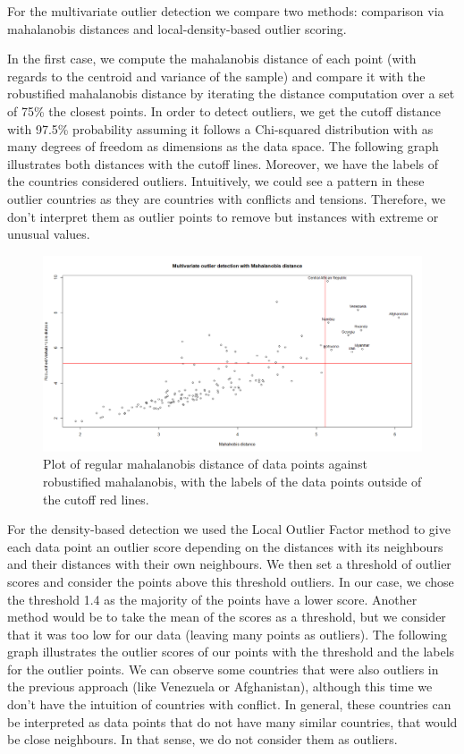 \documentclass[12pt]{extarticle}
\begin{document}
For the multivariate outlier detection we compare two methods: comparison via mahalanobis distances and local-density-based outlier scoring.

In the first case, we compute the mahalanobis distance of each point (with regards to the centroid and variance of the sample) and compare it with the robustified mahalanobis distance by iterating the distance computation over a set of 75\% the closest points. In order to detect outliers, we get the cutoff distance with 97.5\% probability assuming it follows a Chi-squared distribution with as many degrees of freedom as dimensions as the data space. The following graph illustrates both distances with the cutoff lines. Moreover, we have the labels of the countries considered outliers. Intuitively, we could see a pattern in these outlier countries as they are countries with conflicts and tensions. Therefore, we don’t interpret them as outlier points to remove but instances with extreme or unusual values.

\begin{figure}[H]
  \centering
    \includegraphics[width=1
    \textwidth]{figures/mahalanobis.png}
    \caption{Plot of regular mahalanobis distance of data points against robustified mahalanobis, with the labels of the data points outside of the cutoff red lines.\label{fig:mahalanobis}}
\end{figure}

For the density-based detection we used the Local Outlier Factor method to give each data point an outlier score depending on the distances with its neighbours and their distances with their own neighbours. We then set a threshold of outlier scores and consider the points above this threshold outliers. In our case, we chose the threshold 1.4 as the majority of the points have a lower score. Another method would be to take the mean of the scores as a threshold, but we consider that it was too low for our data (leaving many points as outliers). The following graph illustrates the outlier scores of our points with the threshold and the labels for the outlier points. We can observe some countries that were also outliers in the previous approach (like Venezuela or Afghanistan), although this time we don’t have the intuition of countries with conflict. In general, these countries can be interpreted as data points that do not have many similar countries, that would be close neighbours. In that sense, we do not consider them as outliers.
\end{document}
